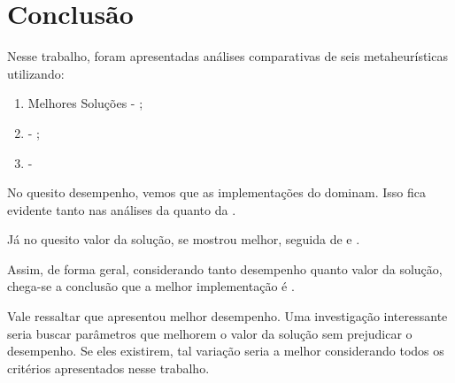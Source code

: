 \section{Conclusão}
\label{section:conclusion}

Nesse trabalho, foram apresentadas análises comparativas de seis metaheurísticas utilizando:

\begin{enumerate}
    \item Melhores Soluções - ;
    \item \tttfull - ;
    \item \perfprof - 
\end{enumerate}

No quesito desempenho, vemos que as implementações do \grasp dominam. Isso fica evidente tanto nas análises da  quanto da .

Já no quesito valor da solução, \tabuVanilla se mostrou melhor, seguida de \graspBest e \geneticVanilla.

Assim, de forma geral, considerando tanto desempenho quanto valor da solução, chega-se a conclusão que a melhor implementação é \graspBest.

Vale ressaltar que \graspFirst apresentou melhor desempenho. Uma investigação interessante seria buscar parâmetros que melhorem o valor da solução sem prejudicar o desempenho. Se eles existirem, tal variação seria a melhor considerando todos os critérios apresentados nesse trabalho.

